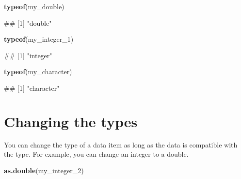 \documentclass[
]{book}
\newenvironment{Shaded}{\begin{snugshade}}{\end{snugshade}}
\newcommand{\FunctionTok}[1]{\textcolor[rgb]{0.13,0.29,0.53}{\textbf{#1}}}
\newcommand{\NormalTok}[1]{#1}
\begin{document}
\begin{Shaded}
\begin{Highlighting}[]
\FunctionTok{typeof}\NormalTok{(my\_double)}
\end{Highlighting}
\end{Shaded}

\begin{Shaded}
\begin{Highlighting}[]
\NormalTok{\#\# [1] "double"}
\end{Highlighting}
\end{Shaded}

\begin{Shaded}
\begin{Highlighting}[]
\FunctionTok{typeof}\NormalTok{(my\_integer\_1)}
\end{Highlighting}
\end{Shaded}

\begin{Shaded}
\begin{Highlighting}[]
\NormalTok{\#\# [1] "integer"}
\end{Highlighting}
\end{Shaded}

\begin{Shaded}
\begin{Highlighting}[]
\FunctionTok{typeof}\NormalTok{(my\_character)}
\end{Highlighting}
\end{Shaded}

\begin{Shaded}
\begin{Highlighting}[]
\NormalTok{\#\# [1] "character"}
\end{Highlighting}
\end{Shaded}

\section{Changing the types}\label{changing-the-types}

You can change the type of a data item as long as the data is compatible with the type. For example, you can change an integer to a double.

\begin{Shaded}
\begin{Highlighting}[]
\FunctionTok{as.double}\NormalTok{(my\_integer\_2)}
\end{Highlighting}
\end{Shaded}
\end{document}
